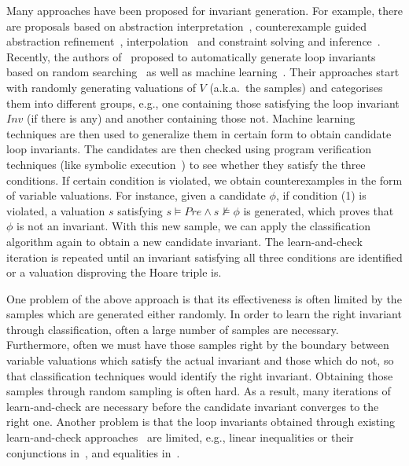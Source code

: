 Many approaches have been proposed for invariant generation.
For example, there are proposals based on abstraction interpretation~\cite{cousot1978automatic,mine2006octagon,cousot1979systematic,karr1976affine,vincent2009subpolyhedra}, counterexample guided abstraction refinement~\cite{henzinger2003software,thomas2001slam,edmund2003counterexample}, interpolation~\cite{kenneth2010lazy,thomas2004abstractions,kenneth2003interpolation,Kenneth2006lazy} and constraint solving and inference~\cite{ashutosh2009invgen,michael2003linear,sumit2009constraint}.
Recently, the authors of~\cite{sharma2012interpolants,sharma2013verification,DBLP:conf/esop/0001GHALN13,sharma2014invariant} proposed to automatically generate loop invariants based on random searching~\cite{sharma2014invariant} as well as machine learning~\cite{sharma2012interpolants}.
Their approaches start with randomly generating valuations of $V$ (a.k.a.~the samples) and categorises them into different groups, e.g., one containing those satisfying the loop invariant $\mathit{Inv}$ (if there is any) and another containing those not. Machine learning techniques are then used to generalize them in certain form to obtain candidate loop invariants.
The candidates are then checked using program verification techniques (like symbolic execution~\cite{symbolic}) to see whether they satisfy the three conditions. If certain condition is violated, we obtain counterexamples in the form of variable valuations.
For instance, given a candidate $\phi$, if condition (1) is violated, a valuation $s$ satisfying $s \models Pre \land s \not \models \phi$ is generated, which proves that $\phi$ is not an invariant.
With this new sample, we can apply the classification algorithm again to obtain a new candidate invariant. The learn-and-check iteration is repeated until an invariant satisfying all three conditions are identified or a valuation disproving the Hoare triple is.

One problem of the above approach is that its effectiveness is often limited by the samples which are generated either randomly. In order to learn the right invariant through classification, often a large number of samples are necessary. Furthermore, often we must have those samples right by the boundary between variable valuations which satisfy the actual invariant and those which do not, so that classification techniques would identify the right invariant. Obtaining those samples through random sampling is often hard. As a result, many iterations of learn-and-check are necessary before the candidate invariant converges to the right one. Another problem is that the loop invariants obtained through existing learn-and-check approaches~\cite{sharma2012interpolants,sharma2013verification,DBLP:conf/esop/0001GHALN13,sharma2014invariant} are limited, e.g., linear inequalities or their conjunctions in~\cite{sharma2012interpolants}, and equalities in~\cite{DBLP:conf/esop/0001GHALN13}.

